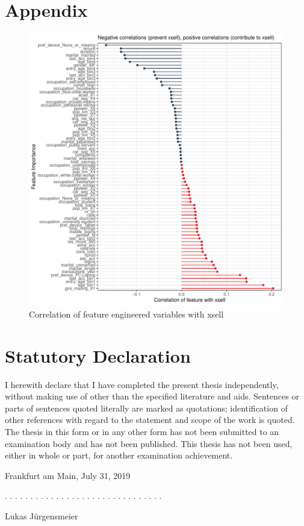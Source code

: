 \documentclass[12pt,a4paper]{article}
\begin{document}
\section{Appendix}
\begin{figure}[ht]
	\centering
  \includegraphics[scale=0.8]{figures/corrplot.pdf}
	\caption{Correlation of feature engineered variables with xsell}
	\label{fig_corr}
\end{figure}


\clearpage


\newpage
\thispagestyle{empty}
\section*{Statutory Declaration}\label{statutory-declaration}

I herewith declare that I have completed the present thesis independently, without making use of
other than the specified literature and aids. Sentences or parts of sentences quoted literally are
marked as quotations; identification of other references with regard to the statement and scope of
the work is quoted. The thesis in this form or in any other form has not been submitted to an examination body and has not been published.
This thesis has not been used, either in whole or part, for another examination achievement.

\vspace{1cm}

Frankfurt am Main, July 31, 2019
\vspace{2cm}

. . . . . . . . . . . . . . . . . . . . . . . . . . . . . . .
\vspace{0.1cm}

Lukas J\"urgensmeier
\end{document}
